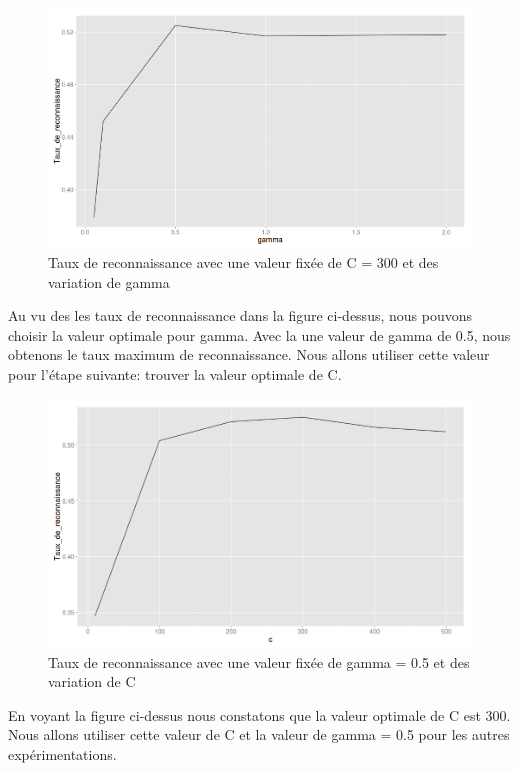 \documentclass[french,12pt,a4paper,oneside,notitlepage]{report}
\begin{document}
\begin{figure}[ht]
	\begin{center}
	  \includegraphics[width=12cm]{findgamma.png}
	\end{center}
	 \caption{Taux de reconnaissance avec une valeur fixée de C = 300 et des variation de 
gamma}
\end{figure}

Au vu des les taux de reconnaissance dans la figure ci-dessus, nous pouvons choisir la 
valeur optimale pour gamma. Avec la une valeur de gamma de 0.5, nous obtenons le taux 
maximum de reconnaissance. Nous allons utiliser cette valeur pour l'étape suivante: 
trouver la valeur optimale de C.

\begin{figure}[ht]
	\begin{center}
	  \includegraphics[width=12cm]{findc.png}
	\end{center}
	 \caption{Taux de reconnaissance avec une valeur fixée de gamma = 0.5 et des 
variation de C}
\end{figure}

En voyant la figure ci-dessus nous constatons que la valeur optimale de C est 300. Nous 
allons utiliser cette valeur de C et la valeur de gamma = 0.5 pour les autres 
expérimentations.
\end{document}
